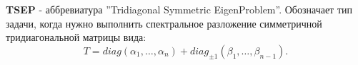 \textbf{TSEP} - аббревиатура ''Tridiagonal Symmetric EigenProblem''. Обозначает тип задачи, когда нужно выполнить спектральное разложение симметричной тридиагональной матрицы вида:
\[
        T= diag(\alpha_1,\dots,\alpha_n)+diag_{\pm1}(\beta_1,\dots,\beta_{n-1}).
\]
% 
